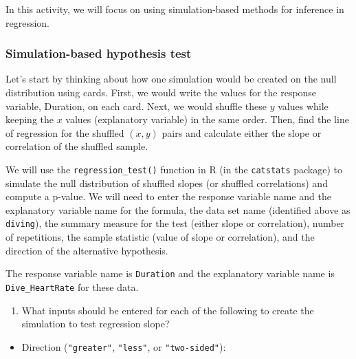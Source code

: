 \documentclass[
]{report}
\providecommand{\tightlist}{%
  \setlength{\itemsep}{0pt}\setlength{\parskip}{0pt}}
\begin{document}
In this activity, we will focus on using simulation-based methods for inference in regression.

\hypertarget{simulation-based-hypothesis-test}{%
\subsubsection*{Simulation-based hypothesis test}\label{simulation-based-hypothesis-test}}

Let's start by thinking about how one simulation would be created on the null distribution using cards. First, we would write the values for the response variable, Duration, on each card. Next, we would shuffle these \(y\) values while keeping the \(x\) values (explanatory variable) in the same order. Then, find the line of regression for the shuffled \((x, y)\) pairs and calculate either the slope or correlation of the shuffled sample.

We will use the \texttt{regression\_test()} function in R (in the \texttt{catstats} package) to simulate the null distribution of shuffled slopes (or shuffled correlations) and compute a p-value. We will need to enter the response variable name and the explanatory variable name for the formula, the data set name (identified above as \texttt{diving}), the summary measure for the test (either slope or correlation), number of repetitions, the sample statistic (value of slope or correlation), and the direction of the alternative hypothesis.

The response variable name is \texttt{Duration} and the explanatory variable name is \texttt{Dive\_HeartRate} for these data.

\begin{enumerate}
\def\labelenumi{\arabic{enumi}.}
\setcounter{enumi}{8}
\tightlist
\item
  What inputs should be entered for each of the following to create the simulation to test regression slope?
\end{enumerate}

\vspace{.5 mm}

\begin{itemize}
\tightlist
\item
  Direction (\texttt{"greater"}, \texttt{"less"}, or \texttt{"two-sided"}):
\end{itemize}

\vspace{.2in}
\end{document}
